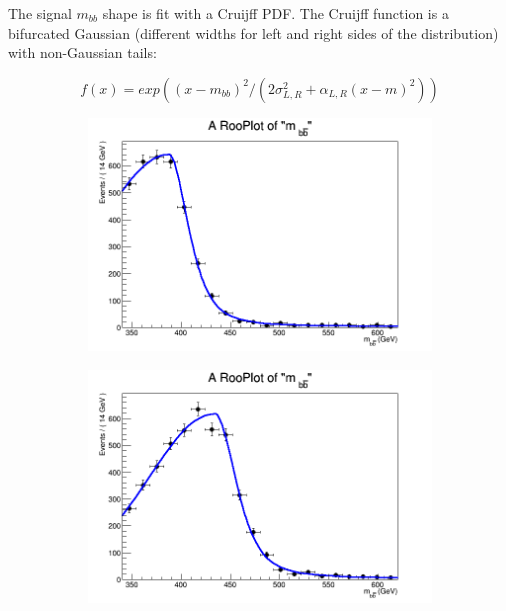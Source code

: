 The signal $m_{bb}$ shape is fit with a Cruijff PDF.  The Cruijff function is a bifurcated Gaussian (different widths for left and right sides of the distribution) with non-Gaussian tails: 

\begin{equation}
f(x) = exp((x-m_{bb})^2 / (2\sigma^2_{L,R} + \alpha_{L,R}(x-m)^2))
\end{equation}



\begin{figure}[phtb!]
  \begin{center}
  \begin{subfigure}[$m_{A}=400$ GeV]{0.4\textwidth}\includegraphics[width=\textwidth]{FitResults/images/fitMC_bAbb400_1.png}\end{subfigure}
  \begin{subfigure}[$m_{A}=450$ GeV]{0.4\textwidth}\includegraphics[width=\textwidth]{FitResults/images/fitMC_bAbb450_1.png}\end{subfigure}

\end{center}
\end{figure}

